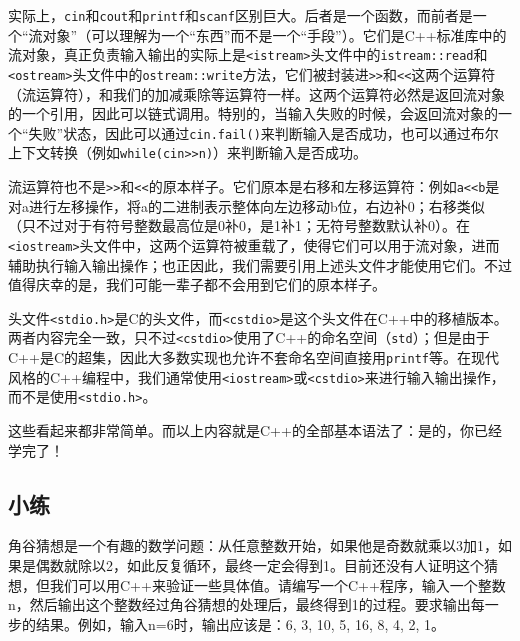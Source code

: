 \begin{note}
  实际上，\texttt{cin}和\texttt{cout}和\texttt{printf}和\texttt{scanf}区别巨大。后者是一个函数，而前者是一个“流对象”（可以理解为一个“东西”而不是一个“手段”）。它们是C++标准库中的流对象，真正负责输入输出的实际上是\texttt{<istream>}头文件中的\texttt{istream::read}和\texttt{<ostream>}头文件中的\texttt{ostream::write}方法，它们被封装进\texttt{>>}和\texttt{<<}这两个运算符（流运算符），和我们的加减乘除等运算符一样。这两个运算符必然是返回流对象的一个引用，因此可以链式调用。特别的，当输入失败的时候，会返回流对象的一个“失败”状态，因此可以通过\texttt{cin.fail()}来判断输入是否成功，也可以通过布尔上下文转换（例如\texttt{while(cin>>n)}）来判断输入是否成功。

  流运算符也不是\texttt{>>}和\texttt{<<}的原本样子。它们原本是右移和左移运算符：例如\texttt{a<<b}是对a进行左移操作，将a的二进制表示整体向左边移动b位，右边补0；右移类似（只不过对于有符号整数最高位是0补0，是1补1；无符号整数默认补0）。在\texttt{<iostream>}头文件中，这两个运算符被重载了，使得它们可以用于流对象，进而辅助执行输入输出操作；也正因此，我们需要引用上述头文件才能使用它们。不过值得庆幸的是，我们可能一辈子都不会用到它们的原本样子。

  头文件\texttt{<stdio.h>}是C的头文件，而\texttt{<cstdio>}是这个头文件在C++中的移植版本。两者内容完全一致，只不过\texttt{<cstdio>}使用了C++的命名空间（\texttt{std}）；但是由于C++是C的超集，因此大多数实现也允许不套命名空间直接用\texttt{printf}等。在现代风格的C++编程中，我们通常使用\texttt{<iostream>}或\texttt{<cstdio>}来进行输入输出操作，而不是使用\texttt{<stdio.h>}。
\end{note}

这些看起来都非常简单。而以上内容就是C++的全部基本语法了：是的，你已经学完了！

\subsection{小练}

\begin{example}
  角谷猜想是一个有趣的数学问题：从任意整数开始，如果他是奇数就乘以3加1，如果是偶数就除以2，如此反复循环，最终一定会得到1。目前还没有人证明这个猜想，但我们可以用C++来验证一些具体值。请编写一个C++程序，输入一个整数n，然后输出这个整数经过角谷猜想的处理后，最终得到1的过程。要求输出每一步的结果。例如，输入n=6时，输出应该是：6, 3, 10, 5, 16, 8, 4, 2, 1。
\end{example}

